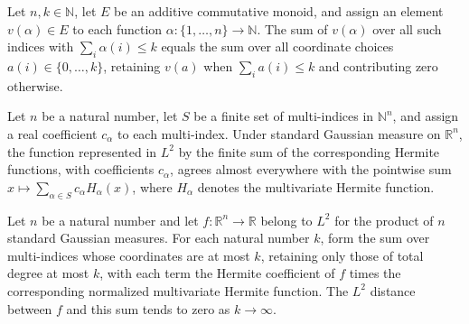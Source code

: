 \begin{lemma}
\label{BooleanAnalysis.GaussianSpace.sum_hermiteDegreeIndices}
\leanok
{}
Let $n,k\in\mathbb N$, let $E$ be an additive commutative monoid, and assign an element
$v(\alpha)\in E$ to each function $\alpha\colon\{1,\ldots,n\}\to\mathbb N$. The sum of
$v(\alpha)$ over all such indices with $\sum_i\alpha(i)\le k$ equals the sum over all
coordinate choices $a(i)\in\{0,\ldots,k\}$, retaining $v(a)$ when $\sum_i a(i)\le k$ and
contributing zero otherwise.
\end{lemma}

\begin{lemma}
\label{BooleanAnalysis.GaussianSpace.coeFn_sum_hermiteL2}
\leanok
{}
Let $n$ be a natural number, let $S$ be a finite set of multi-indices in $\mathbb N^n$,
and assign a real coefficient $c_\alpha$ to each multi-index. Under standard Gaussian
measure on $\mathbb R^n$, the function represented in $L^2$ by the finite sum of the
corresponding Hermite functions, with coefficients $c_\alpha$, agrees almost everywhere
with the pointwise sum $x\mapsto\sum_{\alpha\in S}c_\alpha H_\alpha(x)$, where
$H_\alpha$ denotes the multivariate Hermite function.
\end{lemma}

\begin{theorem}
\label{BooleanAnalysis.GaussianSpace.hermite_degree_truncation_tendsto}
\leanok
{}
Let $n$ be a natural number and let $f:\mathbb{R}^n\to\mathbb{R}$ belong to $L^2$ for
the product of $n$ standard Gaussian measures. For each natural number $k$, form the sum
over multi-indices whose coordinates are at most $k$, retaining only those of total
degree at most $k$, with each term the Hermite coefficient of $f$ times the
corresponding normalized multivariate Hermite function. The $L^2$ distance between $f$
and this sum tends to zero as $k\to\infty$.
\end{theorem}
